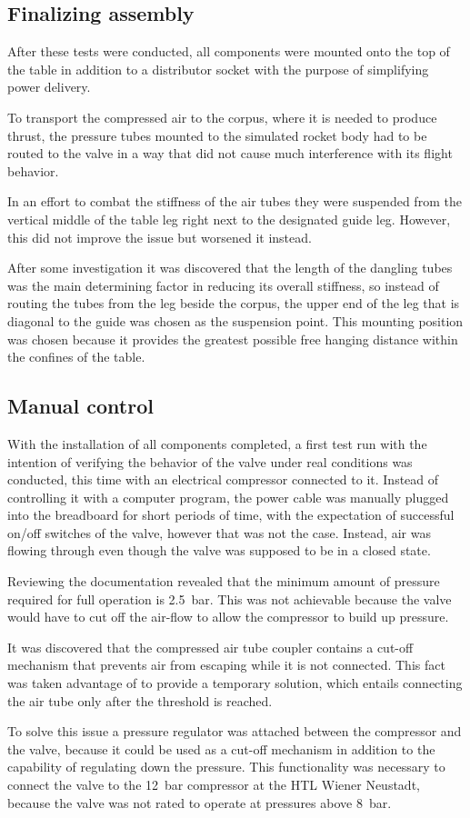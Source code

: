 \subsection{Finalizing assembly}
After these tests were conducted, all components were mounted onto the top of the table in addition to a distributor socket with the purpose of simplifying power delivery.

To transport the compressed air to the corpus, where it is needed to produce thrust, the pressure tubes mounted to the simulated rocket body had to be routed to the valve in a way that did not cause much interference with its flight behavior. 

In an effort to combat the stiffness of the air tubes they were suspended from the vertical middle of the table leg right next to the designated guide leg. However, this did not improve the issue but worsened it instead. 

After some investigation it was discovered that the length of the dangling tubes was the main determining factor in reducing its overall stiffness, so instead of routing the tubes from the leg beside the corpus, the upper end of the leg that is diagonal to the guide was chosen as the suspension point. This mounting position was chosen because it provides the greatest possible free hanging distance within the confines of the table.


\subsection{Manual control}
With the installation of all components completed, a first test run with the intention of verifying the behavior of the valve under real conditions was conducted, this time with an electrical compressor connected to it. Instead of controlling it with a computer program, the power cable was manually plugged into the breadboard for short periods of time, with the expectation of successful on/off switches of the valve, however that was not the case. Instead, air was flowing through even though the valve was supposed to be in a closed state. 

Reviewing the documentation revealed that the minimum amount of pressure required for full operation is \SI{2,5}{\bar}. This was not achievable because the valve would have to cut off the air-flow to allow the compressor to build up pressure.

It was discovered that the compressed air tube coupler contains a cut-off mechanism that prevents air from escaping while it is not connected. This fact was taken advantage of to provide a temporary solution, which entails connecting the air tube only after the threshold is reached. 

To solve this issue a pressure regulator was attached between the compressor and the valve, because it could be used as a cut-off mechanism in addition to the capability of regulating down the pressure. This functionality was necessary to connect the valve to the \SI{12}{\bar} compressor at the HTL Wiener Neustadt, because the valve was not rated to operate at pressures above \SI{8}{\bar}.
